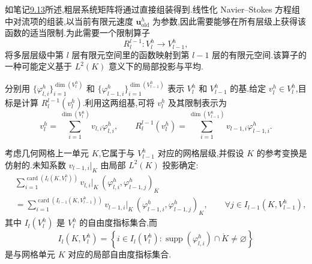 \begin{note}[函数限制]
\label{note:chapter9-function-restriction}
如笔记\hyperref[note:chapter9-coarse-system-matrices]{9.13}所述,粗层系统矩阵将通过直接组装得到.线性化 Navier--Stokes 方程组中对流项的组装,以当前有限元速度 $\bm u_{\mathrm{old}}^h$ 为参数,因此需要能够在所有层级上获得该函数的适当限制.为此需要一个限制算子
\[
 R_l^{l-1}:V_l^h\longrightarrow V_{l-1}^h,
\]
将多层层级中第 $l$ 层有限元空间里的函数映射到第 $l-1$ 层的有限元空间.该算子的一种可能定义基于 $L^2(K)$ 意义下的局部投影与平均.

分别用 $\{\varphi_{l,i}^h\}_{i=1}^{\dim(V_l^h)}$ 和 $\{\varphi_{l-1,i}^h\}_{i=1}^{\dim(V_{l-1}^h)}$ 表示 $V_l^h$ 和 $V_{l-1}^h$ 的基.给定 $v_l^h\in V_l^h$,目标是计算 $R_l^{l-1}(v_l^h)$.利用这两组基,可将 $v_l^h$ 及其限制表示为
\[
 v_l^h=\sum_{i=1}^{\dim(V_l^h)}v_{l,i}\varphi_{l,i}^h,
 \qquad
 R_l^{l-1}(v_l^h)=
 \sum_{i=1}^{\dim(V_{l-1}^h)}v_{l-1,i}\varphi_{l-1,i}^h.
\]

考虑几何网格上一单元 $K$,它属于与 $V_{l-1}^h$ 对应的网格层级,并假设 $K$ 的参考变换是仿射的.未知系数 $v_{l-1,i}|_K$ 由局部 $L^2(K)$ 投影确定:
\[
\begin{aligned}
 &\sum_{i=1}^{\operatorname{card}(I_l(K,V_l^h))}
   v_{l,i}|_K\,(\varphi_{l,i}^h,\varphi_{l-1,j}^h)_K\\
 &=\sum_{i=1}^{\operatorname{card}(I_{l-1}(K,V_{l-1}^h))}
   v_{l-1,i}|_K\,(\varphi_{l-1,i}^h,\varphi_{l-1,j}^h)_K,
 \qquad \forall j\in I_{l-1}(K,V_{l-1}^h),
\end{aligned}
\]
其中 $I_l(V_l^h)$ 是 $V_l^h$ 的自由度指标集合,而
\[
 I_l(K,V_l^h)=\left\{i\in I_l(V_l^h):
   \operatorname{supp}(\varphi_{l,i}^h)\cap\mathring K\ne\varnothing\right\}
\]
是与网格单元 $K$ 对应的局部自由度指标集合.


\end{note}
